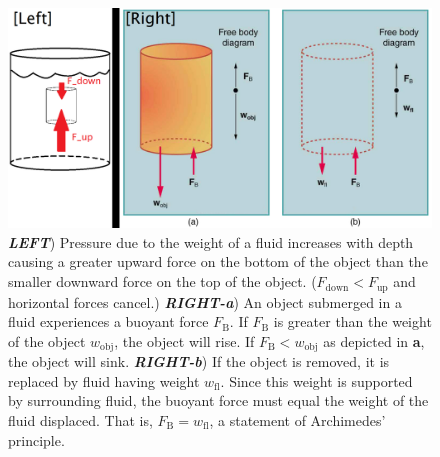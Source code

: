 \begin{figure}[ht]
  \begin{center}
    \includegraphics[width=5.3in]{Fall/Experiment08Figures_Fluids/M08_fig00_2.png}
  \end{center}
  \caption{\textbf{\textit{LEFT}}) Pressure due to the weight of a fluid increases with depth causing a greater upward force on the bottom of the object than the smaller downward force on the top of the object. ($F_{\text{down}} < F_{\text{up}}$ and horizontal forces cancel.) \textbf{\textit{RIGHT-a}}) An object submerged in a fluid experiences a buoyant force $F_\text{B}$. If $F_\text{B}$ is greater than the weight of the object $w_\text{obj}$, the object will rise. If $F_\text{B} < w_\text{obj}$ as depicted in \textbf{a}, the object will sink. \textbf{\textit{RIGHT-b}}) If the object is removed, it is replaced by fluid having weight $w_\text{fl}$. Since this weight is supported by surrounding fluid, the buoyant force must equal the weight of the fluid displaced. That is, $F_\text{B} = w_\text{fl}$, a statement of Archimedes’ principle.}
  \label{M08_fluids_Fig01}
\end{figure}

